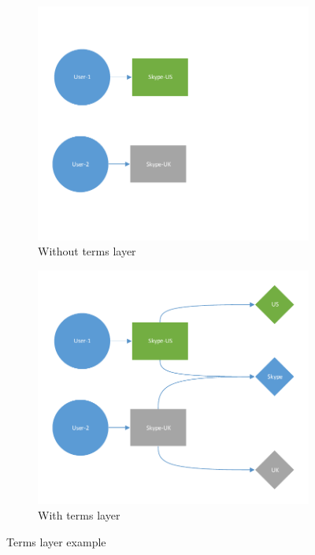 \documentclass[ijoc,nonblindrev]{informs3} %
\numberwithin{equation}{subsection}
\begin{document}
\begin{figure}[t]
\centering
\begin{subfigure}[b]{0.49\textwidth}
	\centering
	\includegraphics[width=\textwidth]{figures/skype_exampe1.pdf}
	\caption{Without terms layer}
\end{subfigure}
\begin{subfigure}[b]{0.49\textwidth}
	\centering
	\includegraphics[width=\textwidth]{figures/skype_exampe2.pdf}
	\caption{With terms layer}
\end{subfigure}
	\caption{Terms layer example}
	\label{fig:terms_layer}
\end{figure}
\end{document}
